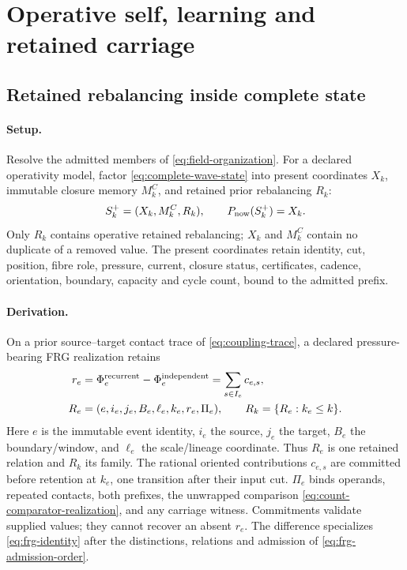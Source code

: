 \section{Operative self, learning and retained carriage}
\label{sec:awareness-learning}

\subsection{Retained rebalancing inside complete state}
\label{subsec:awareness-state}
\paragraph{Setup.}
Resolve the admitted members of \eqref{eq:field-organization}.
For a declared operativity model, factor \eqref{eq:complete-wave-state}
into present coordinates \(X_k\),
immutable closure memory \(M^C_k\), and retained prior rebalancing \(R_k\):
\begin{equation}
 S_k^+=(X_k,M^C_k,R_k),\qquad P_{\rm now}(S_k^+)=X_k.
 \label{eq:awareness-state-factorization}
\end{equation}
Only \(R_k\) contains operative retained rebalancing; \(X_k\) and
\(M^C_k\) contain no duplicate of a removed value. The present
coordinates retain identity, cut, position, fibre role, pressure, current,
closure status, certificates, cadence, orientation, boundary, capacity and cycle
count, bound to the admitted prefix.

\paragraph{Derivation.}
On a prior source--target contact trace of \eqref{eq:coupling-trace}, a declared
pressure-bearing FRG realization retains
\begin{equation}
 \begin{aligned}
 r_e&=\Phi^{\rm recurrent}_e-\Phi^{\rm independent}_e
     =\sum_{s\in I_e}c_{e,s},\\
 R_e&=(e,i_e,j_e,B_e,\ell_e,k_e,r_e,\Pi_e),\qquad
 R_k=\{R_e:k_e\le k\}.
 \end{aligned}
 \label{eq:retained-rebalancing}
\end{equation}
Here \(e\) is the immutable event identity, \(i_e\) the source, \(j_e\)
the target, \(B_e\) the boundary/window, and \(\ell_e\) the scale/lineage
coordinate. Thus \(R_e\) is one retained relation and \(R_k\) its family.
The rational oriented contributions \(c_{e,s}\) are committed before retention
at \(k_e\), one transition after their input cut. \(\Pi_e\) binds operands,
repeated contacts, both prefixes, the unwrapped comparison
\eqref{eq:count-comparator-realization}, and any carriage witness.
Commitments validate supplied values; they cannot recover an absent \(r_e\).
The difference specializes \eqref{eq:frg-identity} after the distinctions,
relations and admission of \eqref{eq:frg-admission-order}.

